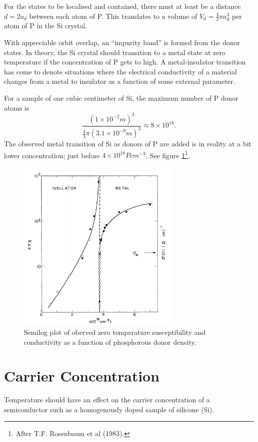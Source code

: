 \documentclass[11pt]{amsart}
\begin{document}
For the states to be localised and contained, there must at least be a distance $d=2a_d$ between each atom of P. This translates to a volume of $V_d = \frac{4}{3}\pi a_d^3$ per atom of P in the Si crystal. 

With appreciable orbit overlap, an ``impurity band'' is formed from the donor states. In theory, the Si crystal should transition to a metal state at zero temperature if the concentration of P gets to high. A metal-insulator transition has come to denote situations where the electrical conductivity of a material changes from a metal to insulator as a function of some external parameter.

For a sample of one cubic centimeter of Si, the maximum number of P donor atoms is
\begin{equation*}
\frac{(1\times10^{-2}m)^3}{\frac{4}{3}\pi(3.1\times10^{-9}m)^3} \approx 8 \times 10^{18}.
\end{equation*}
The observed metal transition of Si as donors of P are added is in reality at a bit lower concentration; just before $4\times10^{18} Pcm^{-3}$. See figure \ref{fig:rosenbaum1}\footnote{After T.F. Rosenbaum et al (1983).}.

\begin{figure}
\centering
	\includegraphics[width = 0.7\textwidth]{rosenbaum1.png}
	\caption{Semilog plot of oberved zero temperature susceptibility and conductivity as a function of phosphorous donor density.}
	\label{fig:rosenbaum1}
\end{figure}

\section{Carrier Concentration}
Temperature should have an effect on the carrier concentration of a semiconductor such as a homogenously doped sample of silicone (Si). 
\end{document}

